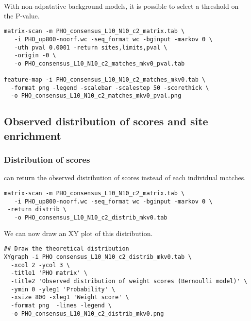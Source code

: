 With non-adpatative background models, it is possible to select a threshold on the P-value.

{\color{Blue} \begin{footnotesize} 
\begin{verbatim}
matrix-scan -m PHO_consensus_L10_N10_c2_matrix.tab \
   -i PHO_up800-noorf.wc -seq_format wc -bginput -markov 0 \
   -uth pval 0.0001 -return sites,limits,pval \
   -origin -0 \
   -o PHO_consensus_L10_N10_c2_matches_mkv0_pval.tab

feature-map -i PHO_consensus_L10_N10_c2_matches_mkv0.tab \
  -format png -legend -scalebar -scalestep 50 -scorethick \
  -o PHO_consensus_L10_N10_c2_matches_mkv0_pval.png 

\end{verbatim} \end{footnotesize}
}

\subsection{Observed distribution of scores and site enrichment}
\subsubsection{Distribution of scores}
 can return the observed distribution of scores instead of each individual matches.

{\color{Blue} \begin{footnotesize} 
\begin{verbatim}
matrix-scan -m PHO_consensus_L10_N10_c2_matrix.tab \
   -i PHO_up800-noorf.wc -seq_format wc -bginput -markov 0 \
 -return distrib \
   -o PHO_consensus_L10_N10_c2_distrib_mkv0.tab

\end{verbatim} \end{footnotesize}
}

We can now draw an XY plot of this distribution. 

{\color{Blue} \begin{footnotesize} 
\begin{verbatim}
## Draw the theoretical distribution
XYgraph -i PHO_consensus_L10_N10_c2_distrib_mkv0.tab \
  -xcol 2 -ycol 3 \
  -title1 'PHO matrix' \
  -title2 'Observed distribution of weight scores (Bernoulli model)' \
  -ymin 0 -yleg1 'Probability' \
  -xsize 800 -xleg1 'Weight score' \
  -format png  -lines -legend \
  -o PHO_consensus_L10_N10_c2_distrib_mkv0.png
\end{verbatim} \end{footnotesize}
}

